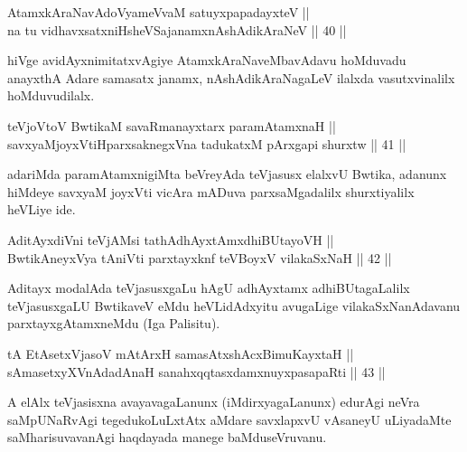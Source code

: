 \begin{shl}
AtamxkAraNavAdoV\s yameVvaM satuyxpapadayxteV || \\
na tu vidhavxsatxniHsheVSajanamxnAshAdikAraNeV \hfill || 40 ||  
\end{shl}

\begin{artha}
hiVge avidAyxnimitatxvAgiye AtamxkAraNaveMbavAdavu hoMduvadu anayxthA
Adare samasatx janamx, nAshAdikAraNagaLeV ilalxda vasutxvinalilx
hoMduvudilalx.
\end{artha}


\begin{shl}
teVjoV\s toV BwtikaM savaRmanayxtarx paramAtamxnaH || \\
savxyaMjoyxVtiHparxsaknegxVna tadukatxM pArxgapi shurxtw \hfill || 41 ||  
\end{shl}

\begin{artha}
adariMda paramAtamxnigiMta beVreyAda teVjasusx elalxvU Bwtika, adanunx
hiMdeye savxyaM joyxVti vicAra mADuva parxsaMgadalilx shurxtiyalilx
heVLiye ide.
\end{artha}

\begin{shl}
AditAyxdiVni teVjAMsi tathA\s dhAyxtAmxdhiBUtayoVH || \\
BwtikAneyxVya tAniVti parxtayxknf teVBoyxV vilakaSxNaH \hfill || 42 ||  
\end{shl}

\begin{artha}
Aditayx modalAda teVjasusxgaLu hAgU adhAyxtamx adhiBUtagaLalilx
teVjasusxgaLU BwtikaveV eMdu heVLidAdxyitu avugaLige
vilakaSxNanAdavanu parxtayxgAtamxneMdu (Iga Palisitu).
\end{artha}

\begin{shl}
tA EtAsetxVjasoV mAtArxH samasAtxshAcx\s \s BimuKayxtaH || \\
sAmasetxyXVnA\s \s dadAnaH sanahxqqtasxdamxnuyxpasapaRti \hfill || 43 ||  
\end{shl}

\begin{artha}
A elAlx teVjasisxna avayavagaLanunx (iMdirxyagaLanunx) edurAgi neVra
saMpUNaRvAgi tegedukoLuLxtAtx aMdare savxlapxvU vAsaneyU uLiyadaMte
saMharisuvavanAgi haqdayada manege baMdu\break seVruvanu.
\end{artha}

